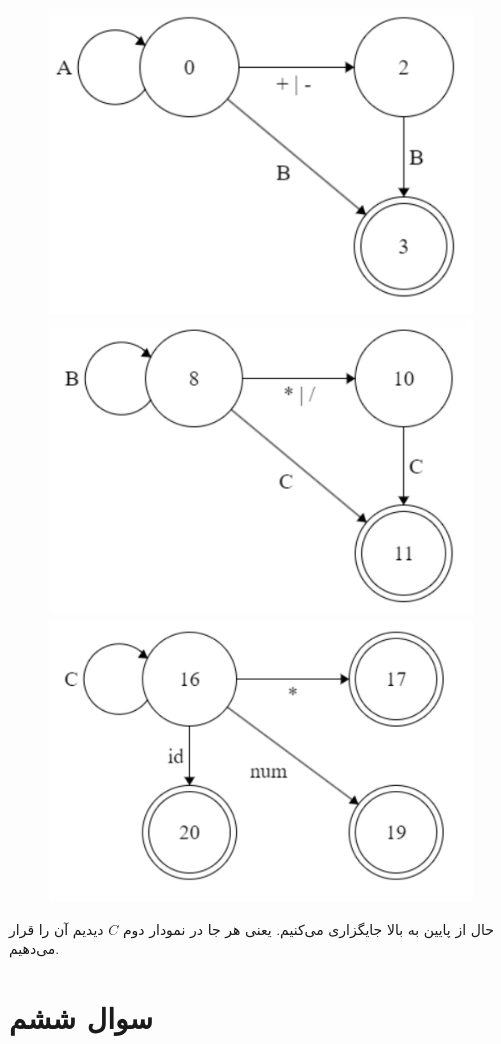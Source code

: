 \documentclass[]{article}
\begin{document}
\begin{figure}[H]
    \centering
    \includegraphics[scale=0.5]{figure/5-1-A-2.png}
    \includegraphics[scale=0.5]{figure/5-1-B-2.png}
    \includegraphics[scale=0.5]{figure/5-1-C-2.png}
\end{figure}
حال از پایین به بالا جایگزاری می‌کنیم. یعنی هر جا در نمودار دوم
$C$
دیدیم
آن را قرار می‌دهیم.
\section*{سوال ششم}
\end{document}
